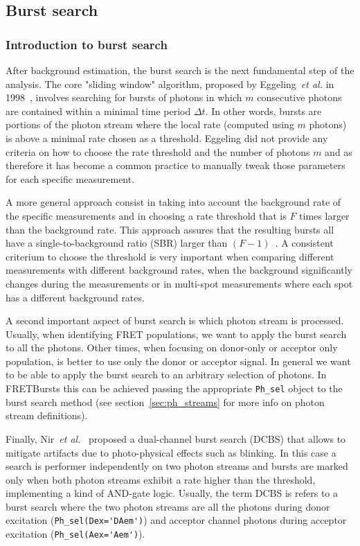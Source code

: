 \subsection{Burst search}
\label{sec:burstsearch}

\subsubsection{Introduction to burst search}
\label{sec:burstsearch_intro}

After background estimation, the burst search is the next fundamental step of the analysis. The core "sliding window" algorithm, proposed by Eggeling~\textit{et al.} in 1998~\cite{Eggeling_1998}, involves searching for bursts of photons
in which $m$ consecutive photons are contained within a minimal time period $\Delta t$. In other words, bursts are portions of the photon stream where the local rate (computed using $m$ photons) is above a minimal rate chosen as a threshold. Eggeling did not provide any criteria on how to choose the rate threshold and the number of photons $m$ and as therefore it has become a common practice to manually tweak those parameters for each specific measurement. 

A more general approach consist in taking into account the background rate of the specific measurements and in choosing a rate threshold that is $F$ times larger than the background rate. This approach assures that the resulting bursts all have a single-to-background ratio (SBR) larger than $(F-1)$~\cite{Michalet_2012}. A consistent criterium to choose the threshold is very important when comparing different measurements with different background rates, when the background significantly changes during the measurements or in multi-spot measurements where each spot has a different background rates.

A second important aspect of burst search is which photon stream is processed. Usually, when identifying FRET populations, we want to apply the burst search to all the photons. Other times, when focusing on donor-only or acceptor only population, is better to use only the donor or acceptor signal. In general we want to be able to apply the burst search to an arbitrary selection of photons. In FRETBursts this can be achieved passing the appropriate \verb|Ph_sel| object to the burst search method (see section~\ref{sec:ph_streams} for more info on photon stream definitions).

Finally, Nir~\textit{et al.}~\cite{Nir_2006} proposed a dual-channel burst search (DCBS) that allows to mitigate artifacts due to photo-physical effects such as blinking. In this case a search is performer independently on two photon streams and bursts are marked only when both photon streams exhibit a rate higher than the threshold, 
implementing a kind of AND-gate logic. 
Usually, the term DCBS is refers to a burst search where the two photon streams are all the photons 
during donor excitation (\verb|Ph_sel(Dex='DAem')|) and acceptor channel photons during acceptor 
excitation (\verb|Ph_sel(Aex='Aem')|).

